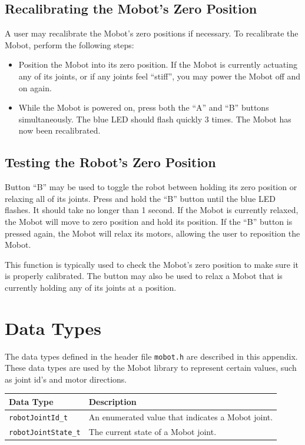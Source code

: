 \documentclass{article}
\begin{document}
\subsection{Recalibrating the Mobot's Zero Position}
A user may recalibrate the Mobot's zero positions if necessary. To recalibrate
the Mobot, perform the following steps:
\begin{itemize}
\item Position the Mobot into its zero position. If the Mobot is currently
actuating any of its joints, or if any joints feel ``stiff'', you may power the
Mobot off and on again.
\item While the Mobot is powered on, press both the ``A'' and ``B'' buttons
simultaneously. The blue LED should flash quickly 3 times. The Mobot has now
been recalibrated.
\end{itemize}

\subsection{\label{sec:zeroposition}Testing the Robot's Zero Position}
Button ``B'' may be used to toggle the robot between holding its zero position 
or relaxing all of its joints. Press and hold the ``B'' button until the blue
LED flashes. It should take no longer than 1 second. If the Mobot is currently relaxed,
the Mobot will move to zero position and hold its position. If the ``B'' button is pressed again, the 
Mobot will relax its motors, allowing the user to reposition the Mobot.

This function is typically used to check the Mobot's zero position to make sure
it is properly calibrated. The button may also be used to relax a Mobot that
is currently holding any of its joints at a position.

\newpage
\appendix
\section{\label{sec:datatypes}Data Types}
The data types defined in the header file \texttt{mobot.h} are described in
this appendix.
These data types are used by the Mobot library to represent 
certain values, such as joint id's and motor directions.

\begin{tabular}{p{3.5cm}p{10cm}} \hline 
Data Type& Description \\
\hline 
\texttt{robotJointId\_t} & An enumerated value that indicates a Mobot joint. \\
\texttt{robotJointState\_t} & The current state of a Mobot joint. \\
\hline
\end{tabular}
\end{document}
